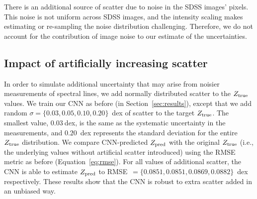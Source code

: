 \documentclass[fleqn,usenatbib]{mnras}
\begin{document}
There is an additional source of scatter due to noise in the SDSS images' pixels. This noise is not uniform across SDSS images, and the \cite{Lupton2004} intensity scaling makes estimating or re-sampling the noise distribution challenging. Therefore, we do not account for the contribution of image noise to our estimate of the uncertainties.





\subsection{Impact of artificially increasing scatter} \label{sec:additional-scatter}


In order to simulate additional uncertainty that may arise from noisier measurements of spectral lines, we add normally distributed scatter to the $Z_{\rm true}$ values. We train our CNN as before (in Section~\ref{sec:results}), except that we add random $\sigma = \{0.03, 0.05, 0.10, 0.20\}$~dex of scatter to the target $Z_{\rm true}$. The smallest value, $0.03~$dex, is the same as the systematic uncertainty in the \cite{Tremonti2004} measurements, and $0.20$~dex represents the standard deviation for the entire $Z_{\rm true}$ distribution. We compare CNN-predicted $Z_{\rm pred}$ with the original $Z_{\rm true}$ (i.e., the underlying values without artificial scatter introduced) using the RMSE metric as before (Equation~\ref{eq:rmse}). For all values of additional scatter, the CNN is able to estimate $Z_{\rm pred}$ to RMSE~$ = \{0.0851, 0.0851, 0.0869, 0.0882\}$~dex respectively. These results show that the CNN is robust to extra scatter added in an unbiased way. %
\end{document}
